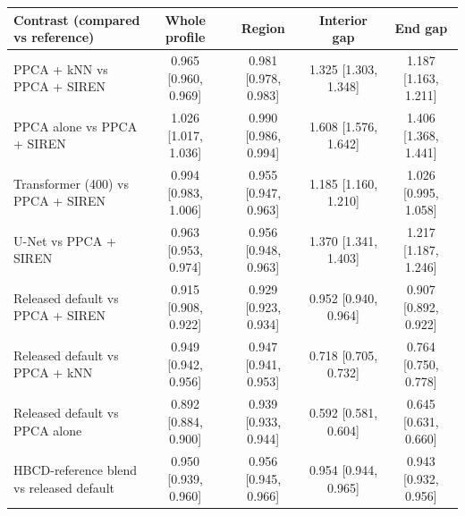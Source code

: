 \begin{tabular}{lcccc}
\toprule
Contrast (compared vs reference) & Whole profile & Region & Interior gap & End gap \\
\midrule
PPCA + kNN vs PPCA + SIREN & 0.965 [0.960, 0.969] & 0.981 [0.978, 0.983] & 1.325 [1.303, 1.348] & 1.187 [1.163, 1.211] \\
PPCA alone vs PPCA + SIREN & 1.026 [1.017, 1.036] & 0.990 [0.986, 0.994] & 1.608 [1.576, 1.642] & 1.406 [1.368, 1.441] \\
Transformer (400) vs PPCA + SIREN & 0.994 [0.983, 1.006] & 0.955 [0.947, 0.963] & 1.185 [1.160, 1.210] & 1.026 [0.995, 1.058] \\
U-Net vs PPCA + SIREN & 0.963 [0.953, 0.974] & 0.956 [0.948, 0.963] & 1.370 [1.341, 1.403] & 1.217 [1.187, 1.246] \\
Released default vs PPCA + SIREN & 0.915 [0.908, 0.922] & 0.929 [0.923, 0.934] & 0.952 [0.940, 0.964] & 0.907 [0.892, 0.922] \\
Released default vs PPCA + kNN & 0.949 [0.942, 0.956] & 0.947 [0.941, 0.953] & 0.718 [0.705, 0.732] & 0.764 [0.750, 0.778] \\
Released default vs PPCA alone & 0.892 [0.884, 0.900] & 0.939 [0.933, 0.944] & 0.592 [0.581, 0.604] & 0.645 [0.631, 0.660] \\
HBCD-reference blend vs released default & 0.950 [0.939, 0.960] & 0.956 [0.945, 0.966] & 0.954 [0.944, 0.965] & 0.943 [0.932, 0.956] \\
\bottomrule
\end{tabular}
